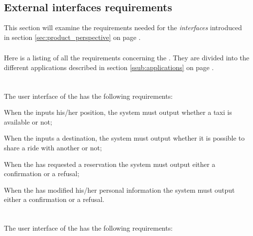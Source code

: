 
\subsection{External interfaces requirements} %
\label{sec:External Interfaces}

This section will examine the requirements needed for the \emph{interfaces} introduced in section \ref{sec:product_perspective} on page \pageref{sec:product_perspective}.



\subsubsection{} %
Here is a listing of all the requirements concerning the . They are divided into the different applications described in section \ref{ssub:applications} on page \pageref{ssub:applications}.

\paragraph{} \hfill \\
The user interface of the  has the following requirements:

\begin{enumerate} [label = \textbf{[IR\arabic*]}]

\item When the \emph{} inputs his/her position, the system must output whether a taxi is available or not;

\item When the \emph{} inputs a destination, the system must output whether it is possible to share a ride with another \emph{} or not;

\item When the \emph{} has requested a reservation the system must output either a confirmation or a refusal;

\item When the \emph{} has modified his/her personal information the system must output either a confirmation or a refusal.

\end{enumerate} 

\paragraph{} \hfill \\
The user interface of the  has the following requirements:

